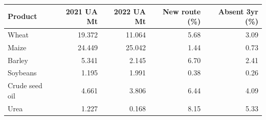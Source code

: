 \begin{tabular}{lrrrr}
\toprule
Product & 2021 UA Mt & 2022 UA Mt & New route (\%) & Absent 3yr (\%) \\
\midrule
Wheat & 19.372 & 11.064 & 5.68 & 3.09 \\
Maize & 24.449 & 25.042 & 1.44 & 0.73 \\
Barley & 5.341 & 2.145 & 6.70 & 2.41 \\
Soybeans & 1.195 & 1.991 & 0.38 & 0.26 \\
Crude seed oil & 4.661 & 3.806 & 6.44 & 4.09 \\
Urea & 1.227 & 0.168 & 8.15 & 5.33 \\
\bottomrule
\end{tabular}
